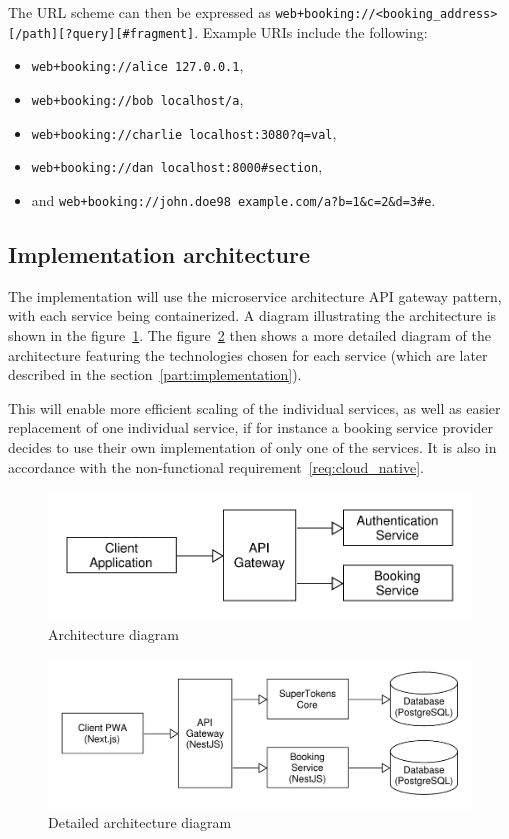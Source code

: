 \begin{sloppypar}
The URL scheme can then be expressed as \texttt{web+booking://<booking_address>[/path][?query][#fragment]}. Example URIs include the following:
\begin{itemize}
    \item \texttt{web+booking://alice~127.0.0.1},
    \item \texttt{web+booking://bob~localhost/a},
    \item \texttt{web+booking://charlie~localhost:3080?q=val},
    \item \texttt{web+booking://dan~localhost:8000#section},
    \item and \texttt{web+booking://john.doe98~example.com/a?b=1&c=2&d=3#e}.
\end{itemize}
\end{sloppypar}

\subsection{Implementation architecture}

The implementation will use the microservice architecture API gateway pattern, with each service being containerized. A diagram illustrating the architecture is shown in the figure~\ref{fig:architecture_diagram}. The figure~\ref{fig:architecture_diagram_detailed} then shows a more detailed diagram of the architecture featuring the technologies chosen for each service (which are later described in the section~\ref{part:implementation}).

This will enable more efficient scaling of the individual services, as well as easier replacement of one individual service, if for instance a booking service provider decides to use their own implementation of only one of the services. It is also in accordance with the non-functional requirement~\ref{req:cloud_native}.

\begin{figure}
    \centering
    \includegraphics[width=1.0\textwidth]{content/design/architecture_diagram.pdf}
    \caption[Architecture diagram]{Architecture diagram}
    \label{fig:architecture_diagram}
\end{figure}

\begin{figure}
    \centering
    \includegraphics[width=1.0\textwidth]{content/design/architecture_diagram_detailed.pdf}
    \caption[Detailed architecture diagram]{Detailed architecture diagram}
    \label{fig:architecture_diagram_detailed}
\end{figure}
